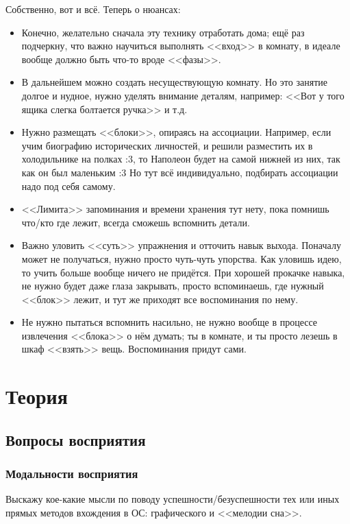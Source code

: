 \documentclass[a5paper,12pt,twoside]{memoir}
\begin{document}
Собственно, вот и всё. Теперь о нюансах:
\begin{itemize}
\item Конечно, желательно сначала эту технику отработать дома; ещё раз подчеркну, что важно научиться выполнять <<вход>> в комнату, в идеале вообще должно быть что-то вроде <<фазы>>. 
\item В дальнейшем можно создать несуществующую комнату. Но это занятие долгое и нудное, нужно уделять внимание деталям, например: <<Вот у того ящика слегка болтается ручка>> и т.д. 
\item Нужно размещать <<блоки>>, опираясь на ассоциации. Например, если учим биографию исторических личностей, и решили разместить их в холодильнике на полках :3, то Наполеон будет на самой нижней из них, так как он был маленьким :3 Но тут всё индивидуально, подбирать ассоциации надо под себя самому. 
\item <<Лимита>> запоминания и времени хранения тут нету, пока помнишь что/кто где лежит, всегда сможешь вспомнить детали. 
\item Важно уловить <<суть>> упражнения и отточить навык выхода. Поначалу может не получаться, нужно просто чуть-чуть упорства. Как уловишь идею, то учить больше вообще ничего не придётся. При хорошей прокачке навыка, не нужно будет даже глаза закрывать, просто вспоминаешь, где нужный <<блок>> лежит, и тут же приходят все воспоминания по нему. 
\item Не нужно пытаться вспомнить насильно, не нужно вообще в процессе извлечения <<блока>> о нём думать; ты в комнате, и ты просто лезешь в шкаф <<взять>> вещь. Воспоминания придут сами.
\end{itemize}



\part{ Теория}


\chapter{Вопросы восприятия}




\section{Модальности восприятия}
Выскажу кое-какие мысли по поводу ус\-пеш\-нос\-ти/без\-ус\-пеш\-нос\-ти тех или иных прямых методов вхождения в ОС: графического и <<мелодии сна>>.
\end{document}
